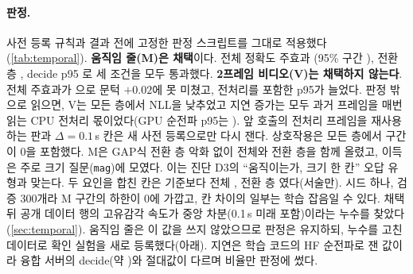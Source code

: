 \paragraph{판정.} 사전 등록 규칙과 결과 전에 고정한 판정 스크립트를 그대로 적용했다(\cref{tab:temporal}). \textbf{움직임 줄(M)은 채택}이다. 전체 정확도 주효과 (95\% 구간 \tentative{$[+0.003, +0.047]$}), 전환 층 , decide p95 로 세 조건을 모두 통과했다. \textbf{2프레임 비디오(V)는 채택하지 않는다}. 전체 주효과가 으로 문턱 $+0.02$에 못 미쳤고, 전처리를 포함한 p95가  늘었다. 판정 밖으로 읽으면, V는 모든 층에서 NLL을 낮추었고 지연 증가는 모두 과거 프레임을 매번 읽는 CPU 전처리 몫이었다(GPU 순전파 p95는 ). 앞 호출의 전처리 프레임을 재사용하는 판과 $\Delta=0.1$\,s 칸은 새 사전 등록으로만 다시 잰다. 상호작용은 모든 층에서 구간이 0을 포함했다. M은 GAP식 전환 층 악화 없이 전체와 전환 층을 함께 올렸고, 이득은 주로 크기 질문(\texttt{mag})에 모였다. 이는 진단 D3의 ``움직이는가, 크기 한 칸'' 오답 유형과 맞는다. 두 요인을 합친 칸은 기준보다 전체 , 전환 층 였다(서술만). 시드 하나, 검증 300개라 M 구간의 하한이 0에 가깝고, 칸 차이의 일부는 학습 잡음일 수 있다. 채택 뒤 공개 데이터 행의 고유감각 속도가 중앙 차분(0.1\,s 미래 포함)이라는 누수를 찾았다(\cref{sec:temporal}). 움직임 줄은 이 값을 쓰지 않았으므로 판정은 유지하되, 누수를 고친 데이터로 확인 실험을 새로 등록했다(아래). 지연은 학습 코드의 HF 순전파로 잰 값이라 융합 서버의 decide(약 )와 절대값이 다르며 비율만 판정에 썼다.

